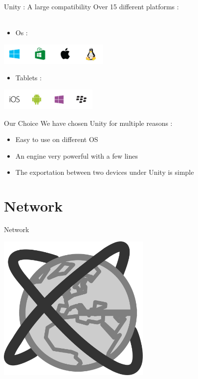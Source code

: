 \documentclass[a4paper,10pt]{beamer}
\begin{document}
			\begin{frame}{Unity : A large compatibility}
				Over 15 different platforms :\\
				\\
				\begin{itemize}
					\item Os :
				\end{itemize}
				\includegraphics[height=30pt]{images/PlatformesDesktop.png}
				
				\begin{itemize}
					\item Tablets :
				\end{itemize}
				\includegraphics[height=30pt]{images/PlatformesTabPhones.png}
			\end{frame}	
			
			\begin{frame}{Our Choice}
				We have chosen Unity for multiple reasons :
				\begin{itemize}
					\item Easy to use on different OS
					\item An engine very powerful with a few lines
					\item The exportation between two devices under Unity is simple
				\end{itemize}			
			\end{frame}
		
	\section{Network}
		
		\begin{frame}{Network}
			\centerline{\includegraphics[height=205pt]{images/network/network.png}}
		\end{frame}
		
\end{document}
